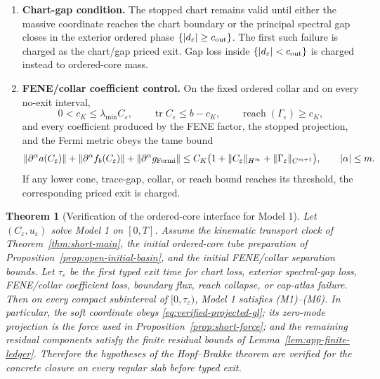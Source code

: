 \documentclass[11pt]{article}
\newtheorem{theorem}{Theorem}[section]
\theoremstyle{definition}
\newcommand{\eps}{\varepsilon}
\begin{document}
\begin{enumerate}[label=(M\arabic*)]
\item \textbf{Chart-gap condition.}
The stopped chart remains valid until either the massive coordinate reaches the
chart boundary or the principal spectral gap closes in the exterior ordered
phase \(\{|d_\eps|\ge c_{\rm out}\}\).  The first such failure is charged as
the chart/gap priced exit.  Gap loss inside \(\{|d_\eps|<c_{\rm out}\}\) is
charged instead to ordered-core mass.

\item \textbf{FENE/collar coefficient control.}
On the fixed ordered collar and on every no-exit interval,
\[
        0<c_K\le \lambda_{\min}C_\eps,
        \qquad
        \operatorname{tr}C_\eps\le b-c_K,
        \qquad
        \operatorname{reach}(\Gamma_\eps)\ge c_K,
\]
and every coefficient produced by the FENE factor, the stopped projection, and
the Fermi metric obeys the tame bound
\[
        \|\partial^\alpha a(C_\eps)\|+
        \|\partial^\alpha f_b(C_\eps)\|+
        \|\partial^\alpha g_{\rm Fermi}\|
        \le C_K\bigl(1+\|C_\eps\|_{H^m}
        +\|\Gamma_\eps\|_{C^{m+1}}\bigr),
        \qquad |\alpha|\le m.
\]
If any lower cone, trace-gap, collar, or reach bound reaches its threshold, the
corresponding priced exit is charged.
\end{enumerate}

\begin{theorem}[Verification of the ordered-core interface for Model 1]
\label{thm:model-one-verification}
Let \((C_\eps,u_\eps)\) solve Model 1 on \([0,T]\).  Assume the kinematic
transport clock of Theorem~\ref{thm:short-main}, the initial ordered-core tube
preparation of Proposition~\ref{prop:open-initial-basin}, and the initial
FENE/collar separation bounds.  Let \(\tau_\eps\) be the first typed exit time
for chart loss, exterior spectral-gap loss, FENE/collar coefficient loss,
boundary flux, reach collapse, or cap-atlas failure.  Then on every compact
subinterval of \([0,\tau_\eps)\), Model 1 satisfies (M1)--(M6).  In particular,
the soft coordinate obeys \eqref{eq:verified-projected-gl}; its zero-mode
projection is the force used in Proposition~\ref{prop:short-force}; and the
remaining residual components satisfy the finite residual bounds of
Lemma~\ref{lem:app-finite-ledger}.  Therefore the hypotheses of the
Hopf--Brakke theorem are verified for the concrete closure on every regular
slab before typed exit.
\end{theorem}
\end{document}
